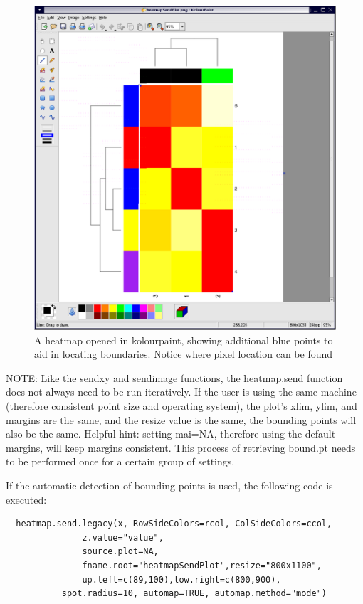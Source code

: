 \documentclass[]{article}
\begin{document}
\begin{center}
\begin{figure}
\includegraphics{heatmapPaint}
\caption{A heatmap opened in kolourpaint, showing additional blue points to aid in locating boundaries. Notice where pixel location can be found}
\end{figure}
\end{center}


NOTE: Like the sendxy and sendimage functions, the heatmap.send function does not always need to be run iteratively. If the user is using the same machine (therefore consistent point size and operating system), the plot's xlim, ylim, and margins are the same, and the resize value is the same, the bounding points will also be the same. Helpful hint: setting mai=NA, therefore using the default margins, will keep margins consistent. This process of retrieving bound.pt needs to be performed once for a certain group of settings.\newline

\indent If the automatic detection of bounding points is used, the following code is executed:
\begin{verbatim}
  heatmap.send.legacy(x, RowSideColors=rcol, ColSideColors=ccol,
               z.value="value",
               source.plot=NA,
               fname.root="heatmapSendPlot",resize="800x1100",
               up.left=c(89,100),low.right=c(800,900),
	       spot.radius=10, automap=TRUE, automap.method="mode")
\end{verbatim}
\end{document}
